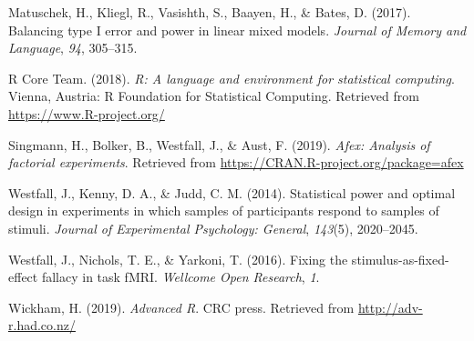 \documentclass[
  english,
  doc,floatsintext]{apa6}
\begin{document}
\leavevmode\hypertarget{ref-matuschek_et_al_2017}{}%
Matuschek, H., Kliegl, R., Vasishth, S., Baayen, H., \& Bates, D. (2017). Balancing type I error and power in linear mixed models. \emph{Journal of Memory and Language}, \emph{94}, 305--315.

\leavevmode\hypertarget{ref-R-base}{}%
R Core Team. (2018). \emph{R: A language and environment for statistical computing}. Vienna, Austria: R Foundation for Statistical Computing. Retrieved from \url{https://www.R-project.org/}

\leavevmode\hypertarget{ref-R-afex}{}%
Singmann, H., Bolker, B., Westfall, J., \& Aust, F. (2019). \emph{Afex: Analysis of factorial experiments}. Retrieved from \url{https://CRAN.R-project.org/package=afex}

\leavevmode\hypertarget{ref-westfall_2014}{}%
Westfall, J., Kenny, D. A., \& Judd, C. M. (2014). Statistical power and optimal design in experiments in which samples of participants respond to samples of stimuli. \emph{Journal of Experimental Psychology: General}, \emph{143}(5), 2020--2045.

\leavevmode\hypertarget{ref-westfall_yarkoni_2016}{}%
Westfall, J., Nichols, T. E., \& Yarkoni, T. (2016). Fixing the stimulus-as-fixed-effect fallacy in task fMRI. \emph{Wellcome Open Research}, \emph{1}.

\leavevmode\hypertarget{ref-wickham-advr}{}%
Wickham, H. (2019). \emph{Advanced R}. CRC press. Retrieved from \url{http://adv-r.had.co.nz/}

\endgroup
\end{document}
